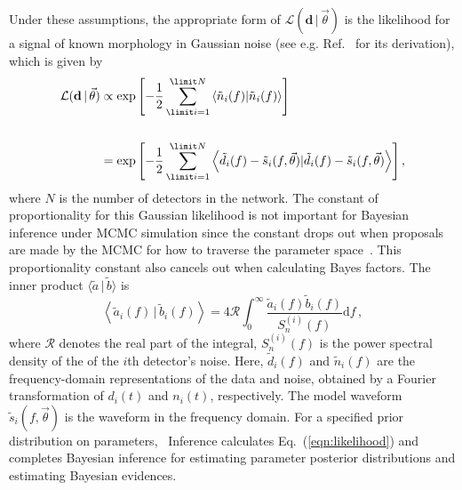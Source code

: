 Under these assumptions, the appropriate form of $\mathcal{L}(\mathbf{d} \, | \, \vec{\theta})$
is the likelihood for a signal of known morphology in Gaussian noise (see
e.g.  Ref.~\cite{wainstein:1962} for its derivation), which is
given by
\begin{equation}\label{eqn:likelihood}
    \begin{split}
    \mathcal{L}(\mathbf{d} \, | \, \vec{\theta}) &\propto 
              \exp \left[ -\frac{1}{2} \sum_{\limit i = 1}^{\limit N} \left \langle \tilde{n}_{i}(f) | \tilde{n}_{i}(f)\right\rangle \right] \\ \\ 
      & = \exp \left[ -\frac{1}{2} \sum_{\limit i = 1}^{\limit N} \left \langle \tilde{d}_{i}(f) - \tilde{s}_{i}(f, \vec{\theta})| \tilde{d}_{i}(f) - \tilde{s}_{i}(f, \vec{\theta})\right \rangle \right],
    \end{split}
\end{equation}
where $N$ is the number of detectors in the network. The constant of proportionality for this Gaussian likelihood
is not important for Bayesian inference under MCMC simulation since the constant drops out
when proposals are made by the MCMC for how to traverse the parameter space~\cite{cbiwer_thesis}.
This proportionality constant also cancels out when calculating Bayes factors.
The inner product $\langle\tilde{a} \, | \, \tilde{b}\rangle$ is
\begin{equation}
    \left \langle \tilde{a}_i(f) \, | \, \tilde{b}_i(f)\right \rangle = 4 \mathcal{R} \int_{0}^{\infty} \frac{\tilde{a}_i(f) \tilde{b}_i(f)}{S^{(i)}_n(f)} \mathrm{d}f \,,
\end{equation}
where $\mathcal{R}$ denotes the real part of the integral,
$S^{(i)}_n(f)$ is the power spectral density of the of the $i$th
detector's noise. Here, $\tilde{d}_{i}(f)$ and $\tilde{n}_{i}(f)$ are the
frequency-domain representations of the data and noise, obtained by a Fourier
transformation of $d_{i}(t)$ and $n_{i}(t)$, respectively. The model waveform
$\tilde{s}_{i}(f, \vec{\theta})$ is the waveform in the frequency domain.
For a specified prior distribution on parameters,
\pycbc{}\ Inference calculates Eq.~(\ref{eqn:likelihood}) and
completes Bayesian inference for estimating parameter posterior distributions and
estimating Bayesian evidences.

